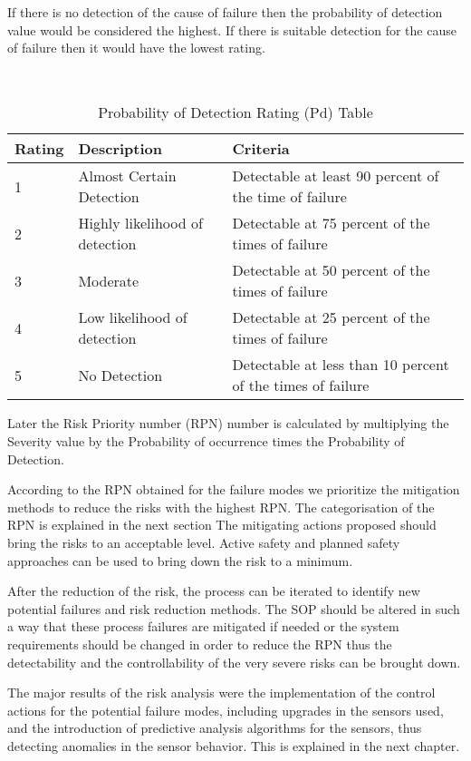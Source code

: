 {If there is no detection of the cause of failure then the probability of detection value would be considered the highest. If there is suitable detection for the cause of failure then it would have the lowest rating. 

\begin{table}[ht]
\centering\
\begin{tabularx}{\linewidth}{|X||X||X|}
\hline
 Rating & Description & Criteria \\
\hline
1 & Almost Certain Detection & Detectable at least 90 percent of the time of failure \\
\hline
2 & Highly likelihood of detection &   Detectable at 75 percent of the times of failure\\
\hline
3 & Moderate &  Detectable at 50 percent of the times of failure \\
 \hline
4 & Low likelihood of detection & Detectable at 25 percent of the times of failure  \\
\hline
5 & No Detection & Detectable at less than 10 percent of the times of failure \\
\hline

\end{tabularx}
  
\caption{Probability of Detection Rating (Pd) Table}

\end{table}


Later the Risk Priority number (RPN) number is calculated by multiplying the Severity value by the Probability of occurrence times the Probability of Detection.

According to the RPN obtained for the failure modes we prioritize the mitigation methods to reduce the risks with the highest RPN. The categorisation of the RPN is explained in the next section
The mitigating actions proposed should bring the risks to an acceptable level. Active safety and planned safety approaches can be used to bring down the risk to a minimum.

After the reduction of the risk, the process can be iterated to identify new potential failures and risk reduction methods. The SOP should be altered in such a way that these process failures are mitigated if needed or the system requirements should be changed in order to reduce the RPN thus the detectability and the controllability of the very severe risks can be brought down.

The major results of the risk analysis were the implementation of the control actions for the potential failure modes, including upgrades in the sensors used, and the introduction of predictive analysis algorithms for the sensors, thus detecting anomalies in the sensor behavior. This is explained in the next chapter.




}
